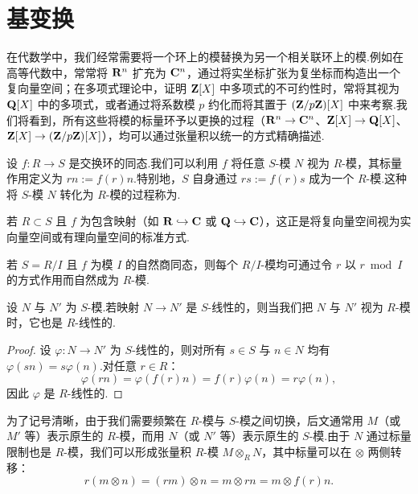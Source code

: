 \section{基变换}
\label{sec:base-ext}

在代数学中，我们经常需要将一个环上的模替换为另一个相关联环上的模.例如在高等代数中，常常将 $\mathbf{R}^n$ 扩充为 $\mathbf{C}^n$，通过将实坐标扩张为复坐标而构造出一个复向量空间；在多项式理论中，证明 $\mathbf{Z}[X]$ 中多项式的不可约性时，常将其视为 $\mathbf{Q}[X]$ 中的多项式，或者通过将系数模 $p$ 约化而将其置于 $(\mathbf{Z}/p\mathbf{Z})[X]$ 中来考察.我们将看到，所有这些将模的标量环予以更换的过程（$\mathbf{R}^n \to \mathbf{C}^n$、$\mathbf{Z}[X] \to \mathbf{Q}[X]$、$\mathbf{Z}[X] \to (\mathbf{Z}/p\mathbf{Z})[X]$），均可以通过张量积以统一的方式精确描述.

设 $f \colon R \to S$ 是交换环的同态.我们可以利用 $f$ 将任意 $S$-模 $N$ 视为 $R$-模，其标量作用定义为 $rn := f(r)n$.特别地，$S$ 自身通过 $rs := f(r)s$ 成为一个 $R$-模.这种将 $S$-模 $N$ 转化为 $R$-模的过程称为.

\begin{example}\label{ex:subring-rest}
若 $R \subset S$ 且 $f$ 为包含映射（如 $\mathbf{R} \hookrightarrow \mathbf{C}$ 或 $\mathbf{Q} \hookrightarrow \mathbf{C}$），这正是将复向量空间视为实向量空间或有理向量空间的标准方式.
\end{example}

\begin{example}\label{ex:quotient-rest}
若 $S = R/I$ 且 $f$ 为模 $I$ 的自然商同态，则每个 $R/I$-模均可通过令 $r$ 以 $r \bmod I$ 的方式作用而自然成为 $R$-模.
\end{example}

\begin{theorem}\label{thm:s-lin-is-r-lin}
设 $N$ 与 $N'$ 为 $S$-模.若映射 $N \to N'$ 是 $S$-线性的，则当我们把 $N$ 与 $N'$ 视为 $R$-模时，它也是 $R$-线性的.
\end{theorem}

\begin{proof}
设 $\varphi \colon N \to N'$ 为 $S$-线性的，则对所有 $s \in S$ 与 $n \in N$ 均有 $\varphi(sn) = s\varphi(n)$.对任意 $r \in R$：
\[
  \varphi(rn) = \varphi(f(r)n) = f(r)\varphi(n) = r\varphi(n),
\]
因此 $\varphi$ 是 $R$-线性的.
\end{proof}

为了记号清晰，由于我们需要频繁在 $R$-模与 $S$-模之间切换，后文通常用 $M$（或 $M'$ 等）表示原生的 $R$-模，而用 $N$（或 $N'$ 等）表示原生的 $S$-模.由于 $N$ 通过标量限制也是 $R$-模，我们可以形成张量积 $R$-模 $M \otimes_R N$，其中标量可以在 $\otimes$ 两侧转移：
\[
  r(m \otimes n) = (rm) \otimes n = m \otimes rn = m \otimes f(r)n.
\]

